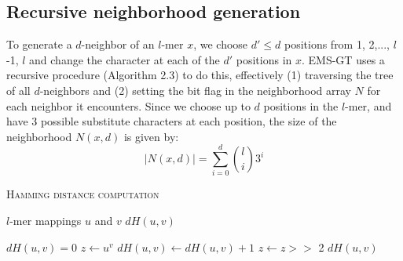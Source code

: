 \documentclass[oneside,12pt]{DISCSthesis}
\begin{document}
{		\subsection{Recursive neighborhood generation}
			To generate a $d$-neighbor of an $l$-mer $x$, we choose $d' \leq d$ positions from 1, 2,..., $l$-1, $l$ and change the character at each of the $d'$ positions in $x$. EMS-GT uses a recursive procedure (Algorithm 2.3) to do this, effectively (1) traversing the tree of all $d$-neighbors and (2) setting the bit flag in the neighborhood array $N$ for each neighbor it encounters. Since we choose up to $d$ positions in the $l$-mer, and have 3 possible substitute characters at each position, the size of the neighborhood $N(x,d)$ is given by: %
			\begin{equation}
				|N(x,d)| = \sum_{i=0}^d \binom{l}{i} 3^{i}
			\end{equation}

		\newpage
		{
			\noindent \hspace*{6pt}{\bf Algorithm 2.2} \textsc{Hamming distance computation}\small
			\begin{algorithmic}[1]\label{alg:hamming-distance-comp}
				\Require $l$-mer mappings $u$ and $v$
				\Ensure $dH(u,v)$\vspace*{6pt}

				\State $dH(u,v) = 0$
				\State $z \leftarrow u ^ v$
				\State $dH(u,v) \leftarrow dH(u,v) + 1$
				\EndIf
				\State $z \leftarrow z >>$ 2
				\EndFor
				\State\Return $dH(u,v)$
				\end{algorithmic}
			}

			\bigskip\bigskip\bigskip

}
\end{document}
